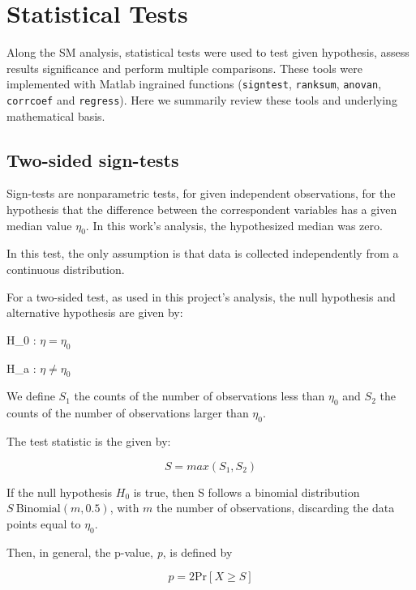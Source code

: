 \chapter{Statistical Tests}
\label{chapter:StatisticalTests}

Along the SM analysis, statistical tests were used to test given hypothesis, assess results significance and perform multiple comparisons. These tools were implemented with Matlab ingrained functions (\texttt{signtest}, \texttt{ranksum}, \texttt{anovan}, \texttt{corrcoef} and \texttt{regress}). Here we summarily review these tools and underlying mathematical basis.

\section{Two-sided sign-tests}
\label{subsec:signtests}

Sign-tests are nonparametric tests, for given independent observations, for the hypothesis that the difference between the correspondent variables has a given median value $\eta_0$. In this work's analysis, the hypothesized median was zero. 

In this test, the only assumption is that data is collected independently from a continuous distribution.

For a two-sided test, as used in this project's analysis, the null hypothesis and alternative hypothesis are given by:

H_0 : $\eta = \eta _0$

H_a : $\eta \neq \eta _0$

We define $S_1$ the counts of the number of observations less than $\eta _0$ and  $S_2$ the counts of the number of observations larger than $\eta _0$. 

The test statistic is the given by:

\begin{equation}
S=max(S_1, S_2)
\end{equation}

If the null hypothesis $H_0$ is true, then S follows a binomial distribution $S ~ \text{Binomial} (m, 0.5)$, with $m$ the number of observations, discarding the data points equal to $\eta _0$.

Then, in general, the p-value, \textit{p}, is defined by

\begin{equation}
p=2 \text{Pr}\left[ X \geq S \right]
\end{equation}

